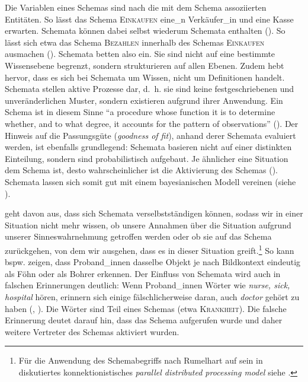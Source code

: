 Die Variablen eines Schemas sind nach \textcite[35]{Rumelhart.1980} die mit dem Schema assoziierten Entitäten. So lässt das Schema \textsc{Einkaufen} eine\_n Verkäufer\_in und eine Kasse erwarten. Schemata können dabei selbst wiederum Schemata enthalten (\cite[37--40]{Rumelhart.1980}). So lässt sich etwa das Schema \textsc{Bezahlen} innerhalb des Schemas \textsc{Einkaufen} ausmachen (\cite[39--40]{Rumelhart.1980}). Schemata betten also ein. Sie sind nicht auf eine bestimmte Wissensebene begrenzt, sondern strukturieren auf allen Ebenen. Zudem hebt \textcite[40]{Rumelhart.1980} hervor, dass es sich bei Schemata um Wissen, nicht um Definitionen handelt. Schemata stellen aktive Prozesse dar, d.~h. sie sind keine festgeschriebenen und unveränderlichen Muster, sondern existieren aufgrund ihrer Anwendung. Ein Schema ist in diesem Sinne "`a procedure whose function it is to determine whether, and to what degree, it accounts for the pattern of observations"' (\cite[39]{Rumelhart.1980}). Der Hinweis auf die Passungsgüte (\textit{goodness of fit}), anhand derer Schemata evaluiert werden, ist ebenfalls grundlegend: Schemata basieren nicht auf einer distinkten Einteilung, sondern sind probabilistisch aufgebaut. Je ähnlicher eine Situation dem Schema ist, desto wahrscheinlicher ist die Aktivierung des Schemas (\cite[39]{Rumelhart.1980}). Schemata lassen sich somit gut mit einem bayesianischen Modell vereinen (siehe ).



 \textcite[38]{Rumelhart.1980} geht davon aus, dass sich Schemata verselbstständigen können, sodass wir in einer Situation nicht mehr wissen, ob unsere Annahmen über die Situation aufgrund unserer Sinneswahrnehmung getroffen werden oder ob sie auf das Schema zurückgehen, von dem wir ausgehen, dass es in dieser Situation greift.\footnote{Für die Anwendung des Schemabegriffs nach Rumelhart auf sein in  diskutiertes konnektionistisches \textit{parallel distributed processing model} siehe \textcite{Rumelhart.1986}.} So kann bspw. \textcite{Bar.2004} zeigen, dass Proband\_innen dasselbe Objekt je nach Bildkontext eindeutig als Föhn oder als Bohrer erkennen. Der Einfluss von Schemata wird auch in falschen Erinnerungen deutlich: Wenn Proband\_innen Wörter wie \textit{nurse, sick, hospital} hören, erinnern sich einige fälsch\-licherweise daran, auch \textit{doctor} gehört zu haben (\cite{Brainerd.2002}, \cite[100]{Goldberg.2019}). Die Wörter sind Teil eines Schemas (etwa \textsc{Krankheit}). Die falsche Erinnerung deutet darauf hin, dass das Schema aufgerufen wurde und daher weitere Vertreter des Schemas aktiviert wurden. 

